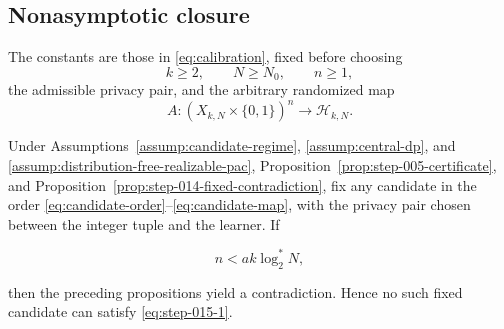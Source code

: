 \subsection{Nonasymptotic closure}\label{app:step-015}
The constants are those in \eqref{eq:calibration}, fixed before choosing
\begin{equation}
k\ge2,
\qquad N\ge N_0,
\qquad n\ge1,
\tag{S15.T2}\label{eq:candidate-order}
\end{equation}
the admissible privacy pair, and the arbitrary randomized map
\begin{equation}
A:(X_{k,N}\times\{0,1\})^n\longrightarrow\mathcal H_{k,N}.
\tag{S15.T4}\label{eq:candidate-map}
\end{equation}
\begin{lemma}\label{lem:step-015-negated-target}
Under Assumptions~\ref{assump:candidate-regime},
\ref{assump:central-dp}, and
\ref{assump:distribution-free-realizable-pac},
Proposition~\ref{prop:step-005-certificate}, and
Proposition~\ref{prop:step-014-fixed-contradiction}, fix any candidate in
the order \eqref{eq:candidate-order}--\eqref{eq:candidate-map}, with the
privacy pair chosen between the integer tuple and the learner. If

\[
n<ak\log_2^*N,
\tag{S15.1}\label{eq:step-015-1}
\]

then the preceding propositions yield a contradiction. Hence no
such fixed candidate can satisfy \eqref{eq:step-015-1}.
\end{lemma}

